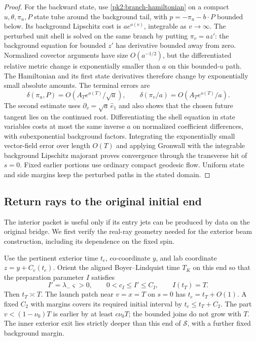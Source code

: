\begin{proof}
For the backward state, use \eqref{pk2:branch-hamiltonian} on a
compact $u,\theta,\pi_u,P$ state tube around the background tail,
with $p=-\pi_u-b\cdot P$ bounded below. Its background Lipschitz
cost is $ae^{o(v)}$, integrable as $v\to\infty$. The perturbed unit
shell is solved on the same branch by putting $\pi_v=az'$: the
background equation for bounded $z'$ has derivative bounded away
from zero. Normalized covector arguments have size $O(a^{-1/2})$,
but the differentiated relative metric change is exponentially
smaller than $a$ on this bounded-$u$ path. The Hamiltonian and its
first state derivatives therefore change by exponentially small
absolute amounts. The terminal errors are
\[
 \delta(\pi_u,P)=O(A_Te^{o(T)}/\sqrt a),
 \qquad \delta(\pi_v/a)=O(A_Te^{o(T)}/a).
\]
The second estimate uses $\partial_v=\sqrt a\,\hat e_1$ and also
shows that the chosen future tangent lies on the continued root.
Differentiating the shell equation in state variables costs at most
the same inverse $a$ on normalized coefficient differences, with
subexponential background factors. Integrating the exponentially
small vector-field error over length $O(T)$ and applying Gronwall
with the integrable background Lipschitz majorant proves convergence
through the transverse hit of $s=0$. Fixed earlier portions use
ordinary compact geodesic flow. Uniform state and side margins keep
the perturbed paths in the stated domain.
\end{proof}

\subsection{Return rays to the original initial end}
\label{pk2:return-rays}

The interior packet is useful only if its entry jets can be produced
by data on the original bridge. We first verify the real-ray geometry
needed for the exterior beam construction, including its dependence
on the fixed spin.

Use the pertinent exterior time $t_e$, co-coordinate $y$, and lab
coordinate $z=y+C_e(t_e)$. Orient the aligned Boyer--Lindquist time
$T_K$ on this end so that the preparation parameter $I$ satisfies
\[
 I'=\lambda_-\varsigma>0,
 \qquad 0<c_I\le I'\le C_I,
 \qquad I(t_T)=T.
\]
Then $t_T\asymp T$. The launch patch near $v=x=T$ on $s=0$ has
$t_e=t_T+O(1)$. A fixed $C_2$ with margins covers its required
initial interval by $t_e\le t_T+C_2$. The part
$v<(1-\nu_0)T$ is earlier by at least $c\nu_0T$; the bounded joins
do not grow with $T$. The inner exterior exit lies strictly deeper
than this end of $\mathcal S$, with a further fixed background margin.

